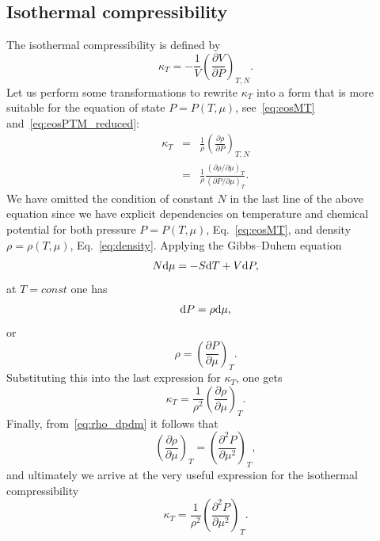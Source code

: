 \documentclass[fleqn,twoside,twocolumn,nofootinbib,showkeys]{revtex4} %
\begin{document}
	\subsection{Isothermal compressibility}
	The isothermal compressibility is defined by
	\begin{equation}
		\label{def:isotherm_compres}
		\kappa_T = -\frac{1}{V}\left(\frac{\partial V}{\partial P}\right)_{T, N}.
	\end{equation}
	Let us perform some transformations to rewrite $\kappa_T$ into a form that is more suitable for the equation of state $P=P(T,\mu)$, see~\eqref{eq:eosMT} and~\eqref{eq:eosPTM_reduced}:
	\begin{eqnarray*}
		\kappa_T	& = & \frac{1}{\rho} \left(\frac{\partial \rho}{\partial P} \right)_{T,N}
		\\
		& = & \frac{1}{\rho} \frac{\left(\partial \rho / \partial \mu\right)_{T}}
		{\left(\partial P / \partial \mu\right)_{T}}.
	\end{eqnarray*}
	We have omitted the condition of constant $N$ in the last line of the above equation since we have explicit dependencies on temperature and chemical potential for both pressure $P = P(T, \mu)$, Eq.~\eqref{eq:eosMT}, and density $\rho = \rho(T, \mu)$, Eq.~\eqref{eq:density}.
	Applying the Gibbs--Duhem equation
	\begin{equation}
		N{\rm d}\mu = -S{\rm d}T + V{\rm d}P,
	\end{equation}
	at $T = const$ one has 
	\begin{equation*}
		{\rm d} P = \rho {\rm d} \mu,
	\end{equation*}
	or
	\begin{equation}
		\label{eq:rho_dpdm}
		\rho = \left(\frac{\partial P}{\partial \mu}\right)_T.
	\end{equation}
	Substituting this into the last expression for $\kappa_T$, one gets
	\begin{equation}
		\kappa_T = \frac{1}{\rho^2} \left(\frac{\partial \rho}{\partial \mu}\right)_{T} .
	\end{equation}
	Finally, from~\eqref{eq:rho_dpdm} it follows that
	\begin{equation}
		\left(\frac{\partial \rho}{\partial \mu}\right)_T = \left(\frac{\partial^2 P}{\partial \mu^2}\right)_T ,
	\end{equation}
	and ultimately we arrive at the very useful expression for the isothermal compressibility
	\begin{equation}
		\kappa_T = \frac{1}{\rho^2} \left(\frac{\partial^2 P}{\partial \mu^2}\right)_{T} .
	\end{equation}
	
\end{document}
